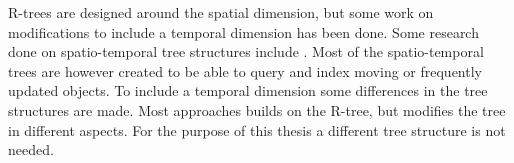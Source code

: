 R-trees are designed around the spatial dimension, but some work on modifications to include a temporal dimension has been done. Some research done on spatio-temporal tree structures include \cite{Tao:2003:TOS:1315451.1315519, r-tree-spatio-temporal}. Most of the spatio-temporal trees are however created to be able to query and index moving or frequently updated objects. To include a temporal dimension some differences in the tree structures are made. Most approaches builds on the R-tree, but modifies the tree in different aspects. For the purpose of this thesis a different tree structure is not needed.\\



\clearpage